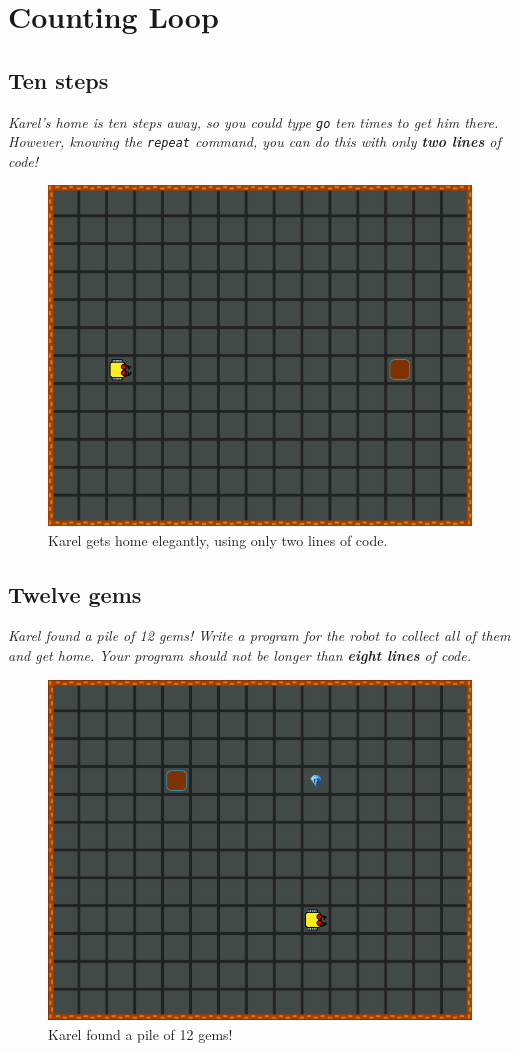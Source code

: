 {{%

\setcounter{section}{5}
\section{Counting Loop}

\subsection{Ten steps}

{\em Karel's home is ten steps away, so you could type {\tt go} ten times to get him there. 
However, knowing the {\tt repeat} command, you can do this with only {\bf two lines} of code!}

\begin{figure}[!ht]
\begin{center}
\includegraphics[height=0.4\textwidth]{img/c01.png}
\end{center}
\vspace{-4mm}
\caption{Karel gets home elegantly, using only two lines of code.}
\label{fig:c01}
\vspace{-1cm}
\end{figure}
\newpage


\subsection{Twelve gems}

{\em Karel found a pile of 12 gems! Write a program for the robot to collect all of them and get home. Your program should not be longer than {\bf eight lines} of code.}

\begin{figure}[!ht]
\begin{center}
\includegraphics[height=0.4\textwidth]{img/c02.png}
\end{center}
\vspace{-4mm}
\caption{Karel found a pile of 12 gems!}
\label{fig:c02}
\vspace{-10mm}
\end{figure}
\noindent



}}

